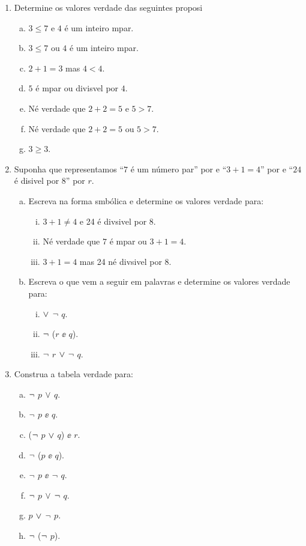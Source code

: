 \begin{enumerate}[{\bf 1.}]
\item Determine os valores verdade das seguintes proposi\coes 
\begin{enumerate}[a)]
\item $3\leq7$ e $4$ \'e um inteiro \ih mpar. 
\item $3\leq7$ ou $4$ \'e um inteiro \ih mpar. 
\item $2+1=3$ mas $4<4$.
\item $5$ \'e \ih mpar ou divis\ih vel por $4$.
\item N\ao \'e verdade que $2+2=5$ e $5>7$.
\item N\ao \'e verdade que $2+2=5$ ou $5>7$.
\item $3 \geq 3$.
\end{enumerate}

\item Suponha que representamos ``$7$ \'e um n\'umero par'' por \pp e ``$3+1=4$'' por \qq e ``$24$ \'e di\ih sivel por $8$'' por $r$. 
\begin{enumerate}[a)]
\item Escreva na forma s\ih mb\'olica e determine os valores verdade para:
\begin{enumerate}[i)]
\item $3+1 \neq 4$ e 24 \'e div\ih sivel por 8.
\item N\ao \'e verdade que $7$ \'e \ih mpar ou $3+1=4$.
\item $3+1=4$ mas 24 n\ao \'e div\ih sivel por 8.
\end{enumerate}

\item Escreva o que vem a seguir em palavras e determine os valores verdade para:
\begin{enumerate}[i)]
\item \pp $\vee$ $\lnot$ $q$.
\item $\lnot$ ($r$ $\ee$ $q$).
\item $\lnot$ $r$ $\vee$ $\lnot$ $q$.
\end{enumerate}
\end{enumerate}

\item Construa a tabela verdade para:
\begin{multicols}{2}
\begin{enumerate}[a)]
\item $\lnot$ $p$ $\vee$ $q$.
\item $\lnot$ $p$ $\ee$ $q$.
\item ($\lnot$ $p$ $\vee$ $q$) $\ee$ $r$.
\item\label{eou3d} $\lnot$ ($p$ $\ee$ $q$).
\item $\lnot$ $p$ $\ee$ $\lnot$ $q$.
\item\label{eou3f}$\lnot$ $p$ $\vee$ $\lnot$ $q$.
\item\label{eou3g}$p$ $\vee$ $\lnot$ $p$.
\item $\lnot$ ($\lnot$ $p$).
\end{enumerate}
\end{multicols}



\end{enumerate}
